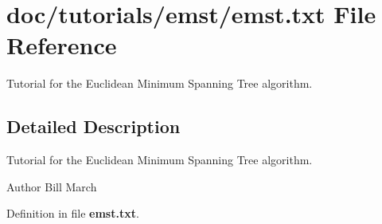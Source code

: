 \section{doc/tutorials/emst/emst.txt File Reference}
\label{emst_8txt}


Tutorial for the Euclidean Minimum Spanning Tree algorithm.  




\subsection{Detailed Description}
Tutorial for the Euclidean Minimum Spanning Tree algorithm. \begin{DoxyAuthor}{Author}
Bill March 
\end{DoxyAuthor}


Definition in file {\bf emst.\-txt}.


